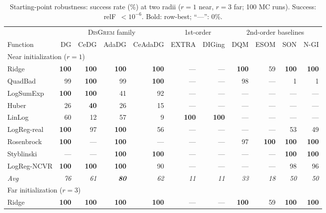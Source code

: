 \documentclass[review,onefignum,onetabnum]{siamart171218}
\begin{document}
	\begin{table}[htbp]
		\centering
		\caption{Starting-point robustness: success rate (\%)
			at two radii ($r{=}1$ near, $r{=}3$ far; 100 MC runs).
			Success: relF~$<10^{-6}$.
			Bold: row-best; ``---'': 0\%.}
		\label{tab:robust}
		\setlength{\tabcolsep}{3pt}
		\footnotesize
		\begin{tabular}{l rrrr rr rrrr}
			\toprule
			& \multicolumn{4}{c}{\textsc{DisGrem} family}
			& \multicolumn{2}{c}{1st-order}
			& \multicolumn{4}{c}{2nd-order baselines} \\
			\cmidrule(lr){2-5}\cmidrule(lr){6-7}\cmidrule(lr){8-11}
			Function & DG & CeDG & AdaDG & CeAdaDG
			& EXTRA & DIGing & DQM & ESOM & SON & N-GI \\
			\midrule
			\multicolumn{11}{l}{Near initialization ($r{=}1$)} \\
			\midrule
			Ridge       & \textbf{100} & \textbf{100} & \textbf{100} & \textbf{100} & --- & --- & \textbf{100} & 59 & \textbf{100} & \textbf{100} \\
			QuadBad     & 99 & \textbf{100} & 99  & \textbf{100} & --- & --- & 98  & --- & 1   & 1   \\
			LogSumExp   & \textbf{100} & \textbf{100} & 41  & 92  & --- & --- & --- & --- & --- & --- \\
			Huber       & 26 & \textbf{40}  & 26  & 15  & --- & --- & --- & --- & --- & --- \\
			LinLog      & 60 & 12  & 57  & 9   & \textbf{100} & \textbf{100} & --- & --- & --- & --- \\
			LogReg-real & \textbf{100} & 97  & \textbf{100} & 56  & --- & --- & --- & --- & 53  & 49  \\
			Rosenbrock  & \textbf{100} & --- & \textbf{100} & --- & --- & --- & 97  & \textbf{100} & \textbf{100} & \textbf{100} \\
			Styblinski  & --- & --- & \textbf{100} & \textbf{100} & --- & --- & --- & --- & \textbf{100} & \textbf{100} \\
			LogReg-NCVR & \textbf{100} & \textbf{100} & \textbf{100} & 90  & --- & --- & --- & --- & 98  & 96  \\
			\textit{Avg} & \textit{76} & \textit{61} & \textbf{\textit{80}} & \textit{62}
			& \textit{11} & \textit{11} & \textit{33} & \textit{18}
			& \textit{50} & \textit{50} \\
			\midrule
			\multicolumn{11}{l}{Far initialization ($r{=}3$)} \\
			\midrule
			Ridge       & \textbf{100} & \textbf{100} & \textbf{100} & \textbf{100} & --- & --- & \textbf{100} & 59  & \textbf{100} & \textbf{100} \\

\end{tabular}
\end{table}
\end{document}
